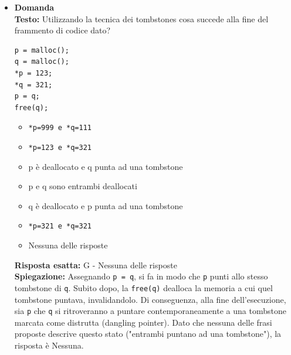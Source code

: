 \documentclass[12pt, a4paper]{article}
\newcounter{domandateoria}
\begin{document}
\begin{itemize}
    \item {}\textbf{Domanda \thedomandateoria} \\
    \textbf{Testo:} Utilizzando la tecnica dei tombstones cosa succede alla fine del frammento di codice dato?
\begin{verbatim}
p = malloc();
q = malloc();
*p = 123;
*q = 321;
p = q;
free(q);
\end{verbatim}
    \begin{itemize}
        \item[A)] \texttt{*p=999 e *q=111}
        \item[B)] \texttt{*p=123 e *q=321}
        \item[C)] p è deallocato e q punta ad una tombstone
        \item[D)] p e q sono entrambi deallocati
        \item[E)] q è deallocato e p punta ad una tombstone
        \item[F)] \texttt{*p=321 e *q=321}
        \item[G)] Nessuna delle risposte
    \end{itemize}
    \textbf{Risposta esatta:} G - Nessuna delle risposte \\
    \textbf{Spiegazione:} Assegnando \texttt{p = q}, si fa in modo che \texttt{p} punti allo stesso tombstone di \texttt{q}. Subito dopo, la \texttt{free(q)} dealloca la memoria a cui quel tombstone puntava, invalidandolo. Di conseguenza, alla fine dell'esecuzione, sia \texttt{p} che \texttt{q} si ritroveranno a puntare contemporaneamente a una tombstone marcata come distrutta (dangling pointer). Dato che nessuna delle frasi proposte descrive questo stato ("entrambi puntano ad una tombstone"), la risposta è Nessuna.
    \vspace{0.3cm}


\end{itemize}
\end{document}
